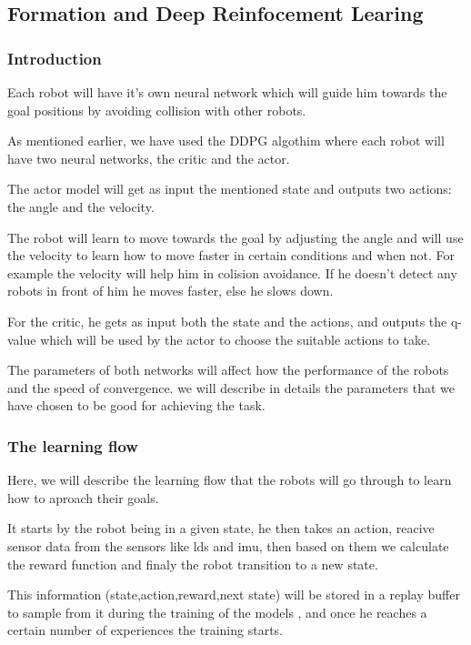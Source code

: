 \documentclass[12pt]{extarticle}
\begin{document}
\pagebreak



\subsection{Formation and Deep Reinfocement Learing}
\subsubsection{Introduction}


Each robot will have it's own neural network which will guide him towards the goal positions by avoiding collision with other robots.

As  mentioned earlier, we have used the DDPG algothim where each robot will have two neural networks, the critic and the actor.

The actor model will get as input the mentioned state and outputs two actions: the angle and the velocity.

The robot will learn to  move towards the goal by adjusting the angle and will use the velocity to learn how to move faster in certain conditions and when not. For example the velocity will
help him in colision avoidance. If he doesn't detect any robots in front of him  he moves faster, else he slows down.


For the critic, he gets as input both the state and the actions, and outputs the q-value which will be used by the actor to choose the suitable actions to take.

The parameters of both networks will affect how the performance of the robots and the speed of convergence. we will describe in details the parameters that we have chosen to be good for achieving the task.

\subsubsection{The learning flow}
Here, we will describe the learning flow that the robots will go through to learn how to aproach their goals.

It starts by the robot being in a given state, he then takes an action,  reacive sensor data from the sensors like lds and imu, then based on them we calculate the reward function and finaly the robot transition to a new state.

This information (state,action,reward,next state) will be stored in a replay buffer to sample from it during the training of the models , and once he reaches a certain number of experiences the training starts.
\end{document}
